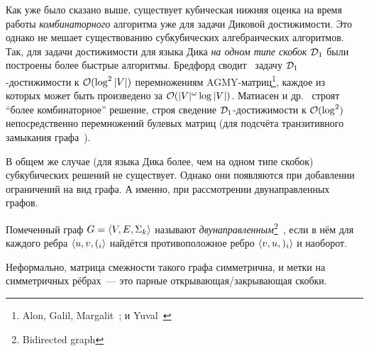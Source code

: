 Как уже было сказано выше, существует кубическая нижняя оценка на время работы \textit{комбинаторного} алгоритма уже для задачи Диковой достижимости. Это однако не мешает существованию субкубических алгебраических алгоритмов. Так, для задачи достижимости для языка Дика \textit{на одном типе скобок} $\mathcal{D}_1$ были построены более быстрые алгоритмы. Бредфорд сводит~\cite{Bradford17} задачу $\mathcal{D}_1$-достижимости к $\mathcal{O}(\log^2 |V|)$ перемножениям AGMY-матриц\footnote{Alon, Galil, Margalit~\cite{Alon1997}; и Yuval~\cite{Yuval1976}}, каждое из которых может быть произведено за $\mathcal{O}(|V|^{\omega} \log |V|)$. Матиасен и др.~\cite{Mathiasen21} строят ``более комбинаторное'' решение, строя сведение $\mathcal{D}_1$-достижимости к $\mathcal{O}(\log^2)$ непосредственно перемножений булевых матриц (для подсчёта транзитивного замыкания графа~\cite{Aho1974}).

В общем же случае (для языка Дика более, чем на одном типе скобок) субкубических решений не существует. Однако они появляются при добавлении ограничений на вид графа. А именно, при рассмотрении двунаправленных графов. 

\begin{definition}
  Помеченный граф $G = \langle V, E, \Sigma_k \rangle$ называют \textit{двунаправленным}\footnote{Bidirected graph}~\cite{Yuan09}, если в нём для каждого ребра $\langle u, v, (_i \rangle$ найдётся противоположное ребро $\langle v, u, )_i \rangle$ и наоборот.

  Неформально, матрица смежности такого графа симметрична, и метки на симметричных рёбрах~--- это парные открывающая/закрывающая скобки.
\end{definition}

